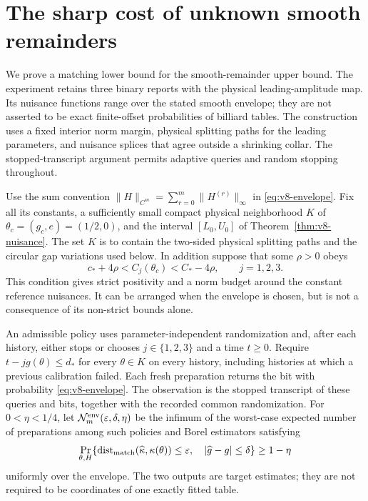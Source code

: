 \section{The sharp cost of unknown smooth remainders}
\label{sec:v9-envelope-minimax}
We prove a matching lower bound for the smooth-remainder upper bound.
The experiment retains three binary reports with the physical
leading-amplitude map.  Its nuisance functions range over the stated
smooth envelope; they are not asserted to be exact finite-offset
probabilities of billiard tables.  The construction uses a fixed
interior norm margin, physical splitting paths for the leading
parameters, and nuisance splices that agree outside a shrinking collar.
The stopped-transcript argument permits adaptive queries and random
stopping throughout.

Use the sum convention
$\|H\|_{C^m}=\sum_{r=0}^m\|H^{(r)}\|_\infty$ in
\eqref{eq:v8-envelope}. Fix all its constants, a sufficiently small
compact physical neighborhood $K$ of
$\theta_c=(g_c,e)=(1/2,0)$, and the interval
$[L_0,U_0]$ of Theorem~\ref{thm:v8-nuisance}. The set $K$ is to
contain the two-sided physical splitting paths and the circular gap
variations used below. In addition suppose that some $\rho>0$ obeys
\begin{equation}\label{eq:v9-interior-slack}
       c_*+4\rho<C_j(\theta_c)<C_*-4\rho,
                                      \qquad j=1,2,3.
\end{equation}
This condition gives strict positivity and a norm budget around the
constant reference nuisances. It can be arranged when the envelope
is chosen, but is not a consequence of its non-strict bounds alone.

An admissible policy uses parameter-independent randomization and,
after each history, either stops or chooses $j\in\{1,2,3\}$ and
a time $t\ge0$. Require $t-jg(\theta)\le d_*$ for every
$\theta\in K$ on every history, including histories at which a
previous calibration failed. Each fresh preparation returns the bit
with probability \eqref{eq:v8-envelope}. The observation is the
stopped transcript of these queries and bits, together with the
recorded common randomization. For $0<\eta<1/4$, let
$\mathcal N_m^{\rm env}(\varepsilon,\delta,\eta)$ be the infimum
of the worst-case expected number of preparations among such policies
and Borel estimators satisfying
\begin{equation}\label{eq:v9-joint-loss}
 \Pr_{\theta,H}\{
 \operatorname{dist}_{\rm match}(\widehat\kappa,\kappa(\theta))
     \le\varepsilon,\quad |\widehat g-g|\le\delta\}\ge1-\eta
\end{equation}
uniformly over the envelope. The two outputs are target estimates;
they are not required to be coordinates of one exactly fitted table.

